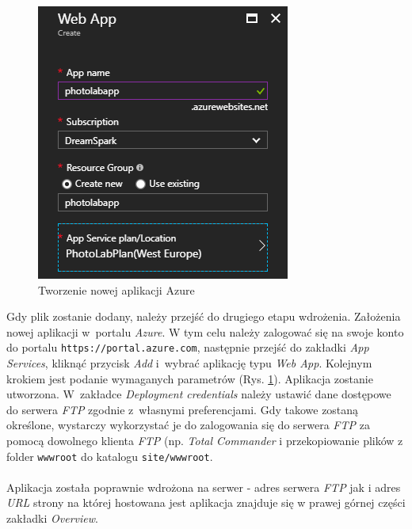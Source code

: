         \begin{figure}
        \includegraphics[width=1\linewidth]{graphics/chapter-4/azure-deploy.png}
        \caption{Tworzenie nowej aplikacji Azure}
        \label{fig:azure-deploy}
        \end{figure}
\noindent Gdy plik zostanie dodany, należy przejść do drugiego etapu wdrożenia. Założenia nowej aplikacji w~portalu \textit{Azure}. W tym celu należy zalogować się na swoje konto do portalu \texttt{https://portal.azure.com}, następnie przejść do zakładki \textit{App Services}, kliknąć przycisk \textit{Add} i~wybrać aplikację typu \textit{Web App}. Kolejnym krokiem jest podanie wymaganych parametrów (Rys. \ref{fig:azure-deploy}). Aplikacja zostanie utworzona. W~zakładce \textit{Deployment credentials} należy ustawić dane dostępowe do serwera \textit{FTP} zgodnie z~własnymi preferencjami.       
 Gdy takowe zostaną określone, wystarczy wykorzystać je do zalogowania się do serwera \textit{FTP} za pomocą dowolnego klienta \textit{FTP} (np. \textit{Total Commander} i przekopiowanie plików z folder \texttt{wwwroot} do katalogu \texttt{site/wwwroot}. \\
 \\
 Aplikacja została poprawnie wdrożona na serwer - adres serwera \textit{FTP} jak i adres \textit{URL} strony na której hostowana jest aplikacja znajduje się w prawej górnej części zakładki \textit{Overview}.
\newpage

